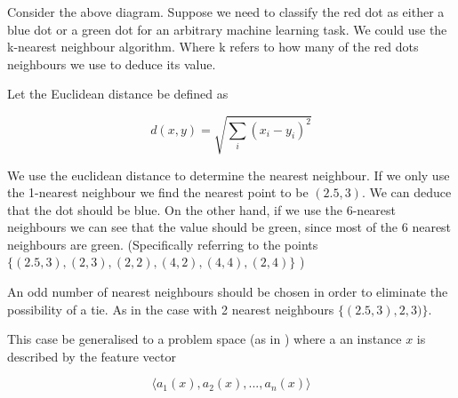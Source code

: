 \documentclass[10pt,a4paper]{article}
\begin{document}

Consider the above diagram. Suppose we need to classify the red dot as either a blue dot or a green dot for an arbitrary machine learning task. We could use the k-nearest neighbour algorithm. Where k refers to how many of the red dots neighbours we use to deduce its value.

Let the Euclidean distance be defined as

\begin{equation}
d(x,y) = \sqrt{\sum_i (x_i - y_i)^2}
\end{equation}

\citep{was}

We use the euclidean distance to determine the nearest neighbour. If we only use the 1-nearest neighbour we find the nearest point to be $(2.5,3)$. We can deduce that the dot should be blue. On the other hand, if we use the 6-nearest neighbours we can see that the value should be green, since most of the 6 nearest neighbours are green. (Specifically referring to the points $\{(2.5,3),(2,3),(2,2),(4,2),(4,4),(2,4)\}$ )

An odd number of nearest neighbours should be chosen in order to eliminate the possibility of a tie. As in the case with 2 nearest neighbours $\{(2.5,3),2,3)\}$.  

This case be generalised to a problem space (as in \cite{Michell2009}) where a an instance $x$ is described by the feature vector

\begin{equation}
\langle a_1 (x),a_2(x),...,a_n(x)\rangle
\end{equation} 
\end{document}
